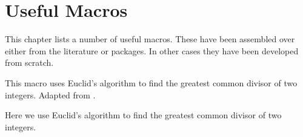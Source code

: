 \chapter{Useful Macros}

This chapter lists a number of useful macros. These have been assembled over either from the literature or packages. In other cases they have been developed from scratch.



This macro uses Euclid's algorithm to find the greatest common divisor of two integers. Adapted from .


\begin{teX}
\def\gcd#1#2{{%
    \ifnum#2=0 \edef\next{#1}\else
        \@tempcnta=#1 \@tempcntb=#2 \divide\@tempcnta by\@tempcntb
        \multiply\@tempcnta by\@tempcntb  %
        \@tempcntb=#1
        \advance\@tempcntb by-\@tempcnta %
        \ifnum\@tempcntb=0
            \@tempcnta=#2
            \ifnum\@tempcnta < 0 \@tempcnta=-\@tempcnta\fi
            \xdef\gcd@next{\noexpand%
                \def\noexpand\thegcd{\the\@tempcnta}}%
        \else
            \xdef\gcd@next{\noexpand\gcd{#2}{\the\@tempcntb}}%
        \fi
    \fi}
    \gcd@next
}
\end{teX}

Here we use Euclid's algorithm to find the greatest common divisor 
of two integers.


\begin{teX}
\def\gcd#1#2{
  {%
    \ifnum#2=0 \edef\next{#1}
    \else
        \@tempcnta=#1 \@tempcntb=#2 
        \divide\@tempcnta by\@tempcntb
        \multiply\@tempcnta by\@tempcntb  %
        \@tempcntb=#1
        \advance\@tempcntb by-\@tempcnta %
        \ifnum\@tempcntb=0
            \@tempcnta=#2
            \ifnum\@tempcnta < 0 \@tempcnta=-\@tempcnta\fi
            \xdef\gcd@next{\noexpand%
                \def\noexpand\thegcd{\the\@tempcnta}}%
        \else
            \xdef\gcd@next{\noexpand\gcd{#2}{\the\@tempcntb}}%
        \fi
    \fi
  }
   \gcd@next
}

\end{teX}


\begin{teX}
\newcommand\reduceFrac[2]
{%
   \gcd{#1}{#2}{\@tempcnta=#1 \divide\@tempcnta by\thegcd
   \@tempcntb=#2 \divide\@tempcntb by\thegcd
   \ifnum\@tempcntb<0\relax
       \@tempcntb=-\@tempcntb
       \@tempcnta=-\@tempcnta
    \fi
    \xdef\rfNumer{\the\@tempcnta}\xdef\rfDenom{\the\@tempcntb}}%
}
\end{teX}


